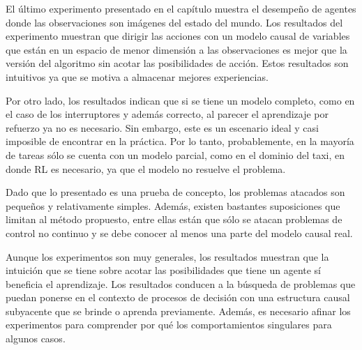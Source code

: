 El último experimento presentado en el capítulo muestra el desempeño
de agentes donde las observaciones son imágenes del estado del mundo. Los resultados del experimento muestran que dirigir las acciones
con un modelo causal de variables que están en un espacio
de menor dimensión a las observaciones es mejor que la versión del algoritmo sin 
acotar las posibilidades de acción. Estos resultados son intuitivos ya que 
se motiva a almacenar mejores experiencias.

Por otro lado, los resultados indican que si se tiene un modelo completo, como en el caso de los interruptores y además correcto, al parecer el aprendizaje por refuerzo ya no es necesario. Sin embargo, este es un escenario ideal y casi imposible de encontrar en la práctica. Por lo tanto, probablemente, en la mayoría de tareas sólo se cuenta con un modelo parcial, como en el dominio del taxi, en donde RL es necesario, ya que 
el modelo no resuelve el problema. 

Dado que lo presentado es una prueba de concepto, los problemas atacados
son pequeños y relativamente simples. Además, existen bastantes suposiciones
que limitan al método propuesto, entre ellas están que sólo se atacan problemas de control
no continuo y se debe conocer al menos una parte del modelo causal real.

Aunque los experimentos son muy generales, los resultados muestran que la intuición que se tiene sobre acotar las posibilidades que tiene un agente sí beneficia el aprendizaje.
Los resultados conducen a la búsqueda
de problemas que puedan ponerse en el contexto de procesos de decisión
con una estructura causal subyacente que se brinde o aprenda previamente. Además,
es necesario afinar los experimentos para comprender por qué los comportamientos singulares para algunos casos.


